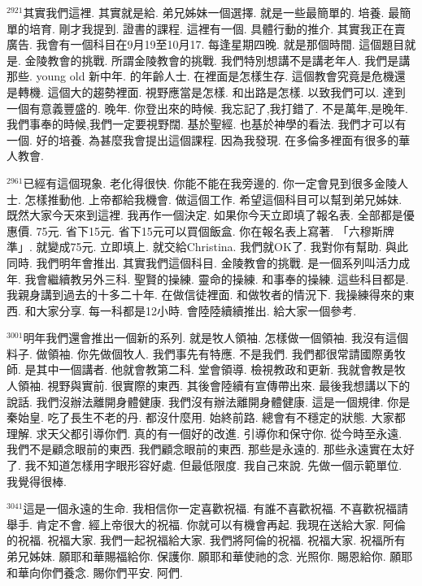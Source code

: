 \documentclass{book}
\begin{document}
$^{2921}$其實我們這裡.
其實就是給.
弟兄姊妹一個選擇.
就是一些最簡單的.
培養.
最簡單的培育.
剛才我提到.
證書的課程.
這裡有一個.
具體行動的推介.
其實我正在賣廣告.
我會有一個科目在9月19至10月17.
每逢星期四晚.
就是那個時間.
這個題目就是.
金陵教會的挑戰.
所謂金陵教會的挑戰.
我們特別想講不是講老年人.
我們是講那些.
young old 新中年.
的年齡人士.
在裡面是怎樣生存.
這個教會究竟是危機還是轉機.
這個大的趨勢裡面.
視野應當是怎樣.
和出路是怎樣.
以致我們可以.
達到一個有意義豐盛的.
晚年.
你登出來的時候.
我忘記了,我打錯了.
不是萬年,是晚年.
我們事奉的時候,我們一定要視野闊.
基於聖經.
也基於神學的看法.
我們才可以有一個.
好的培養.
為甚麼我會提出這個課程.
因為我發現.
在多倫多裡面有很多的華人教會.

$^{2961}$已經有這個現象.
老化得很快.
你能不能在我旁邊的.
你一定會見到很多金陵人士.
怎樣推動他.
上帝都給我機會.
做這個工作.
希望這個科目可以幫到弟兄姊妹.
既然大家今天來到這裡.
我再作一個決定.
如果你今天立即填了報名表.
全部都是優惠價.
75元.
省下15元.
省下15元可以買個飯盒.
你在報名表上寫著.
「六穆斯牌準」.
就變成75元.
立即填上.
就交給Christina.
我們就OK了.
我對你有幫助.
與此同時.
我們明年會推出.
其實我們這個科目.
金陵教會的挑戰.
是一個系列叫活力成年.
我會繼續教另外三科.
聖賢的操練.
靈命的操練.
和事奉的操練.
這些科目都是.
我親身講到過去的十多二十年.
在做信徒裡面.
和做牧者的情況下.
我操練得來的東西.
和大家分享.
每一科都是12小時.
會陸陸續續推出.
給大家一個參考.

$^{3001}$明年我們還會推出一個新的系列.
就是牧人領袖.
怎樣做一個領袖.
我沒有這個料子.
做領袖.
你先做個牧人.
我們事先有特應.
不是我們.
我們都很常請國際勇牧師.
是其中一個講者.
他就會教第二科.
堂會領導.
檢視教政和更新.
我就會教是牧人領袖.
視野與實前.
很實際的東西.
其後會陸續有宣傳帶出來.
最後我想講以下的說話.
我們沒辦法離開身體健康.
我們沒有辦法離開身體健康.
這是一個規律.
你是秦始皇.
吃了長生不老的丹.
都沒什麼用.
始終前路.
總會有不穩定的狀態.
大家都理解.
求天父都引導你們.
真的有一個好的改進.
引導你和保守你.
從今時至永遠.
我們不是顧念眼前的東西.
我們顧念眼前的東西.
那些是永遠的.
那些永遠實在太好了.
我不知道怎樣用字眼形容好處.
但最低限度.
我自己來說.
先做一個示範單位.
我覺得很棒.

$^{3041}$這是一個永遠的生命.
我相信你一定喜歡祝福.
有誰不喜歡祝福.
不喜歡祝福請舉手.
肯定不會.
經上帝很大的祝福.
你就可以有機會再起.
我現在送給大家.
阿倫的祝福.
祝福大家.
我們一起祝福給大家.
我們將阿倫的祝福.
祝福大家.
祝福所有弟兄姊妹.
願耶和華賜福給你.
保護你.
願耶和華使祂的念.
光照你.
賜恩給你.
願耶和華向你們養念.
賜你們平安.
阿們.
\newpage
\end{document}
